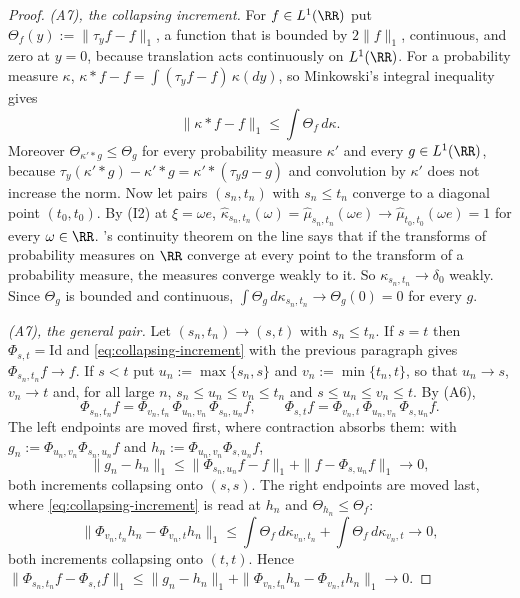 \begin{proof}
\emph{(A7), the collapsing increment.} For $f \in L^1(\RR)$ put
$\Theta_f(y) := \|\tau_yf - f\|_1$, a function that is bounded by $2\|f\|_1$, continuous, and zero
at $y = 0$, because translation acts continuously on $L^1(\RR)$. For a probability measure $\kappa$,
$\kappa * f - f = \int(\tau_yf - f)\,\kappa(dy)$, so Minkowski's integral inequality gives
\begin{equation}\label{eq:collapsing-increment}
  \|\kappa * f - f\|_1 \le \int \Theta_f\,d\kappa .
\end{equation}
Moreover $\Theta_{\kappa' * g} \le \Theta_g$ for every probability measure $\kappa'$ and every
$g \in L^1(\RR)$, because $\tau_y(\kappa' * g) - \kappa' * g = \kappa' * (\tau_yg - g)$ and
convolution by $\kappa'$ does not increase the norm. Now let pairs $(s_n,t_n)$ with
$s_n \le t_n$ converge to a diagonal point $(t_0,t_0)$. By (I2) at $\xi = \omega e$,
$\widehat\kappa_{s_n,t_n}(\omega) = \widehat\mu_{s_n,t_n}(\omega e) \to \widehat\mu_{t_0,t_0}(\omega e) = 1$
for every $\omega \in \RR$. \Levy's continuity theorem on the line  says that if
the transforms of probability measures on $\RR$ converge at every point to the transform of a
probability measure, the measures converge weakly to it. So $\kappa_{s_n,t_n} \to \delta_0$
weakly. Since $\Theta_g$ is bounded and continuous, $\int\Theta_g\,d\kappa_{s_n,t_n} \to
\Theta_g(0) = 0$ for every $g$.

\emph{(A7), the general pair.} Let $(s_n,t_n) \to (s,t)$ with $s_n \le t_n$. If $s = t$ then
$\Phi_{s,t} = \mathrm{Id}$ and \ref{eq:collapsing-increment} with the previous paragraph gives
$\Phi_{s_n,t_n}f \to f$. If $s < t$ put $u_n := \max\{s_n,s\}$ and $v_n := \min\{t_n,t\}$, so
that $u_n \to s$, $v_n \to t$ and, for all large $n$, $s_n \le u_n \le v_n \le t_n$ and
$s \le u_n \le v_n \le t$. By (A6),
\[
  \Phi_{s_n,t_n}f = \Phi_{v_n,t_n}\,\Phi_{u_n,v_n}\,\Phi_{s_n,u_n}f ,
  \qquad
  \Phi_{s,t}f = \Phi_{v_n,t}\,\Phi_{u_n,v_n}\,\Phi_{s,u_n}f .
\]
The left endpoints are moved first, where contraction absorbs them: with
$g_n := \Phi_{u_n,v_n}\Phi_{s_n,u_n}f$ and $h_n := \Phi_{u_n,v_n}\Phi_{s,u_n}f$,
\[
  \|g_n - h_n\|_1 \le \|\Phi_{s_n,u_n}f - f\|_1 + \|f - \Phi_{s,u_n}f\|_1 \to 0 ,
\]
both increments collapsing onto $(s,s)$. The right endpoints are moved last, where
\ref{eq:collapsing-increment} is read at $h_n$ and $\Theta_{h_n} \le \Theta_f$:
\[
  \|\Phi_{v_n,t_n}h_n - \Phi_{v_n,t}h_n\|_1
   \le \int\Theta_f\,d\kappa_{v_n,t_n} + \int\Theta_f\,d\kappa_{v_n,t} \to 0 ,
\]
both increments collapsing onto $(t,t)$. Hence
$\|\Phi_{s_n,t_n}f - \Phi_{s,t}f\|_1 \le \|g_n - h_n\|_1
+ \|\Phi_{v_n,t_n}h_n - \Phi_{v_n,t}h_n\|_1 \to 0$.


\end{proof}
